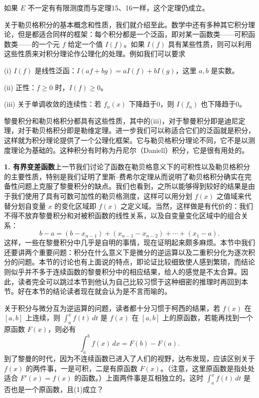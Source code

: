 如果 $E$ 不一定有有限测度而与定理15、16一样，这个定理仍成立。

关于勒贝格积分的基本概念和性质，我们就介绍至此。数学中还有多种其它积分理论，但是都适合同样的框架：每个积分都是一个泛函，即对某一函数类——可积函数类——的一个元 $f$ 给定一个值 $I(f)$。如果 $I(f)$ 具有某些性质，则可以利用这些性质来对积分理论作公理化的处理。例如我们可以要求

(i) $I(f)$ 是线性泛函：$I(af+bg)=aI(f)+bI(g)$，这里 $a,b$ 是实数。

(ii) 正性：$f\ge0$ 时，$I(f)\ge0$。

(iii) 关于单调收敛的连续性：若 $f_n(x)$ 下降趋于0，则 $I(f_n)$ 也下降趋于0。

黎曼积分和勒贝格积分都具有这些性质，其中的(iii)，对于黎曼积分即是迪尼定理，对于勒贝格积分即是勒维定理。进一步我们可以称适合它们的泛函就是积分，这样就为积分理论提供了一个公理化框架。它与勒贝格积分理论不同，它不是以测度理论为基础的。这种积分有时称为丹尼尔（Daniell）积分，它是很有用处的。

\noindent\textbf{1. 有界变差函数}\quad 上一节我们讨论了函数在勒贝格意义下的可积性以及勒贝格积分的主要性质，特别是我们证明了里斯--费希尔定理从而说明了勒贝格积分确实在完备性问题上克服了黎曼积分的缺点。我们也看到，之所以能够得到较好的结果是由于我们使用了具有可数可加性的勒贝格测度，这样可以用分划 $f(x)$ 之值域来代替分划自变量 $x$ 的变化区域即 $f(x)$ 之定义域。当然，这样做是有代价的：我们不得不放弃黎曼积分和对被积函数的线性关系，以及自变量变化区域中的组合关系：
\[
 b-a=(b-x_{n-1})+(x_{n-1}-x_{n-2})+\cdots+(x_1-a).
\]
这样，一些在黎曼积分中几乎是自明的事情，现在证明起来颇多麻烦。本节中我们还要讲两个重要问题：积分在什么意义下是微分的逆运算以及二重积分化为逐次积分的问题。本节的讨论也有上面说的特点，即论证比较细致使人感到繁琐，而结论则似乎并不多于连续函数的黎曼积分中的相应结果，给人的感觉是不太合算。因此，读者完全可以跳过本节到他认为自己比较习惯于这种细密的推理时再回到本节。好在本节的结论读者现在就会认为是不言而喻的。

关于积分与微分互为逆运算的问题，读者都十分习惯于柯西的结果，若 $f(x)$ 在 $[a,b]$ 上连续，则 $\int_a^x f(t)\,dt$ 是 $f(x)$ 在 $[a,b]$ 上的原函数，若能再找到一个原函数 $F(x)$，则必有
\begin{equation}
 \int_a^b f(x)\,dx=F(b)-F(a).
 \tag{1}
\end{equation}
到了黎曼的时代，因为不连续函数已进入了人们的视野，达布发现，应该区别关于 $f(x)$ 的两件事，一是可积，二是有原函数 $F(x)$。（注意，这里原函数是指处处适合 $F'(x)=f(x)$ 的函数。）上面两件事是互相独立的。这时 $\int_a^x f(t)\,dt$ 是否也是一个原函数，且(1)成立？

